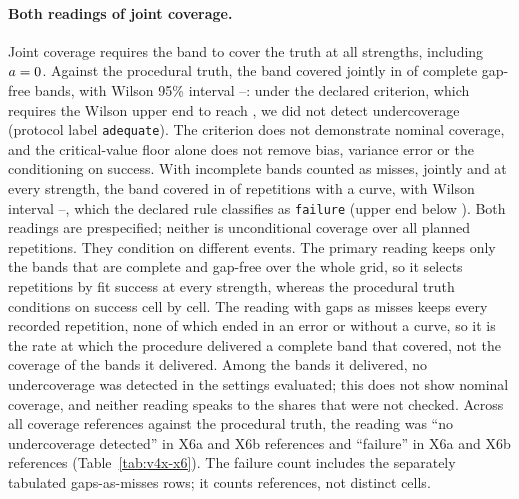 \paragraph{Both readings of joint coverage.}
Joint coverage requires the band to cover the truth at all  strengths, including $a=\resultnum{v4x.protocol.zero}{0}$. Against the procedural truth, the band covered jointly in  of  complete gap-free bands, with Wilson 95\% interval --: under the declared criterion, which requires the Wilson upper end to reach , we did not detect undercoverage (protocol label \texttt{adequate}). The criterion does not demonstrate nominal coverage, and the critical-value floor alone does not remove bias, variance error or the conditioning on success. With incomplete bands counted as misses, jointly and at every strength, the band covered in  of  repetitions with a curve, with Wilson interval --, which the declared rule classifies as \texttt{failure} (upper end below ). Both readings are prespecified; neither is unconditional coverage over all planned repetitions. They condition on different events. The primary reading keeps only the bands that are complete and gap-free over the whole grid, so it selects repetitions by fit success at every strength, whereas the procedural truth conditions on success cell by cell. The reading with gaps as misses keeps every recorded repetition, none of which ended in an error or without a curve, so it is the rate at which the procedure delivered a complete band that covered, not the coverage of the bands it delivered. Among the bands it delivered, no undercoverage was detected in the settings evaluated; this does not show nominal coverage, and neither reading speaks to the shares that were not checked.
Across all coverage references against the procedural truth, the reading was ``no undercoverage detected'' in  X6a and  X6b references and ``failure'' in  X6a and  X6b references (Table~\ref{tab:v4x-x6}). The failure count includes the separately tabulated gaps-as-misses rows; it counts references, not distinct cells.

